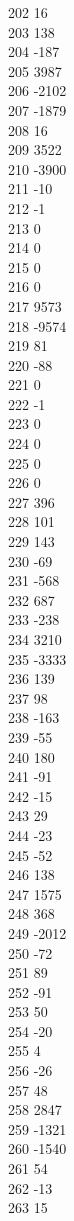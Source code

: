 { 202	16 \\
 203	138 \\
 204	-187 \\
 205	3987 \\
 206	-2102 \\
 207	-1879 \\
 208	16 \\
 209	3522 \\
 210	-3900 \\
 211	-10 \\
 212	-1 \\
 213	0 \\
 214	0 \\
 215	0 \\
 216	0 \\
 217	9573 \\
 218	-9574 \\
 219	81 \\
 220	-88 \\
 221	0 \\
 222	-1 \\
 223	0 \\
 224	0 \\
 225	0 \\
 226	0 \\
 227	396 \\
 228	101 \\
 229	143 \\
 230	-69 \\
 231	-568 \\
 232	687 \\
 233	-238 \\
 234	3210 \\
 235	-3333 \\
 236	139 \\
 237	98 \\
 238	-163 \\
 239	-55 \\
 240	180 \\
 241	-91 \\
 242	-15 \\
 243	29 \\
 244	-23 \\
 245	-52 \\
 246	138 \\
 247	1575 \\
 248	368 \\
 249	-2012 \\
 250	-72 \\
 251	89 \\
 252	-91 \\
 253	50 \\
 254	-20 \\
 255	4 \\
 256	-26 \\
 257	48 \\
 258	2847 \\
 259	-1321 \\
 260	-1540 \\
 261	54 \\
 262	-13 \\
 263	15 \\
}

